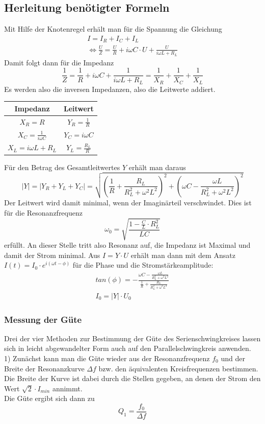 \documentclass[a4paper, 11pt]{article}
\begin{document}
\subsection{Herleitung benötigter Formeln}
Mit Hilfe der Knotenregel erhält man für die Spannung die Gleichung
\begin{eqnarray*}
I = I_R + I_C + I_L \\
\Leftrightarrow \frac{U}{Z} = \frac{U}{R} + i \omega C \cdot U + \frac{U}{i \omega L + R_L}
\end{eqnarray*}
Damit folgt dann für die Impedanz 
\[ \frac{1}{Z} = \frac{1}{R} + i \omega C + \frac{1}{i \omega L + R_L} = \frac{1}{X_R}  + \frac{1}{X_C} + \frac{1}{X_L} \]
Es werden also die inversen Impedanzen, also die Leitwerte addiert. 
\begin{center}
\renewcommand{\arraystretch}{1.5}
\begin{tabular}{|c|c|}
\hline 	Impedanz 	&	Leitwert \\
\hline 	$X_R = R$ 						&	$Y_R = \frac{1}{R}$	\\
\hline 	$X_C = \frac{1}{i \omega C}$ 	&	$Y_C = i \omega C $	\\
\hline 	$X_L = i \omega L + R_L$ 		&	$Y_L = \frac{R_L}{R}$\\
\hline	
\end{tabular}
\end{center}
Für den Betrag des Gesamtleitwertes $Y$ erhält man daraus 
\[ |Y| = | Y_R + Y_L + Y_C| = \sqrt{ \left(\frac{1}{R} + \frac{R_L}{R_L^2 + \omega^2 L^2} \right)^2 + \left( \omega C - \frac{\omega L}{R_L^2 + \omega^2 L^2} \right)^2} \]
Der Leitwert wird damit minimal, wenn der Imaginärteil verschwindet. Dies ist für die Resonanzfrequenz
\[ \omega_0 = \sqrt{\frac{1-\frac{C}{L} \cdot R_L^2}{LC}} \] erfüllt. An dieser Stelle tritt also Resonanz auf, die Impedanz ist Maximal und damit der Strom minimal.
Aus $ I = Y \cdot U$ erhält man dann mit dem Ansatz $I(t) = I_0 \cdot e^{i(\omega t - \phi)}$ für die Phase und die Stromstärkeamplitude:
\begin{eqnarray}
tan(\phi) = - \frac{\omega C - \frac{\omega L}{R_L^2 + \omega^2 L ^2}}{\frac{1}{R} + \frac{R_L}{R_L^2 + \omega^2 L ^2}} \\
I_0 = |Y| \cdot U_0
\end{eqnarray}

\subsubsection{Messung der Güte}
Drei der vier Methoden zur Bestimmung der Güte des Serienschwingkreises lassen sich in leicht abgewandelter Form auch auf den Parallelschwingkreis anwenden.\\
1) Zunächst kann man die Güte wieder aus der Resonanzfrequenz $f_0$ und der Breite der Resonanzkurve $\Delta f$ bzw. den äquivalenten Kreisfrequenzen bestimmen. Die Breite der Kurve ist dabei durch die Stellen gegeben, an denen der Strom den Wert $\sqrt{2} \cdot I_{min}$ annimmt. \\
Die Güte ergibt sich dann zu \[ Q_1 = \frac{f_0}{\Delta f} \]
\end{document}
